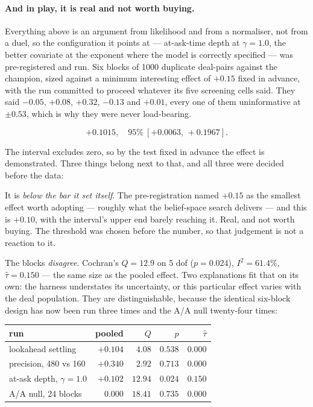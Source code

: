 \documentclass[11pt,a4paper]{article}
\begin{document}
\paragraph{And in play, it is real and not worth buying.}
\label{sec:res-atask} Everything above is an
argument from likelihood and from a normaliser, not from a duel, so the
configuration it points at --- at-ask-time depth at $\gamma = 1.0$, the better
covariate at the exponent where the model is correctly specified --- was
pre-registered and run. Six blocks of 1000 duplicate deal-pairs against the
champion, sized against a minimum interesting effect of $+0.15$ fixed in
advance, with the run committed to proceed whatever its five screening cells
said. They said $-0.05$, $+0.08$, $+0.32$, $-0.13$ and $+0.01$, every one of
them uninformative at $\pm 0.53$, which is why they were never load-bearing.

\[
  +0.1015, \quad 95\%\ [+0.0063,\, +0.1967].
\]

The interval excludes zero, so by the test fixed in advance the effect is
demonstrated. Three things belong next to that, and all three were decided
before the data:

It is \emph{below the bar it set itself}. The pre-registration named $+0.15$ as
the smallest effect worth adopting --- roughly what the belief-space search
delivers --- and this is $+0.10$, with the interval's upper end barely reaching
it. Real, and not worth buying. The threshold was chosen before the number, so
that judgement is not a reaction to it.

The blocks \emph{disagree}. Cochran's $Q = 12.9$ on 5 dof ($p = 0.024$),
$I^2 = 61.4\%$, $\hat\tau = 0.150$ --- the same size as the pooled effect. Two
explanations fit that on its own: the harness understates its uncertainty, or
this particular effect varies with the deal population. They are distinguishable,
because the identical six-block design has now been run three times and the A/A
null twenty-four times:

\begin{center}
\small
\begin{tabular}{lrrrr}
\toprule
run & pooled & $Q$ & $p$ & $\hat\tau$ \\
\midrule
lookahead settling & $+0.104$ & $4.08$ & $0.538$ & $0.000$ \\
precision, 480 vs 160 & $+0.340$ & $2.92$ & $0.713$ & $0.000$ \\
at-ask depth, $\gamma = 1.0$ & $+0.102$ & $12.94$ & $\mathbf{0.024}$ & $\mathbf{0.150}$ \\
A/A null, 24 blocks & $0.000$ & $18.41$ & $0.735$ & $0.000$ \\
\bottomrule
\end{tabular}
\end{center}
\end{document}
